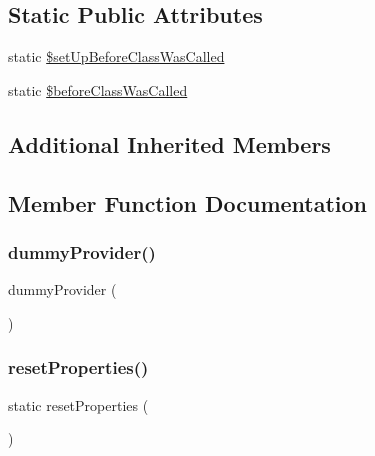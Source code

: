 \subsection*{Static Public Attributes}
\begin{DoxyCompactItemize}
\item 
static \mbox{\hyperlink{class_before_class_with_only_data_provider_test_a4f19a38698772667be46a51959914faf}{\$set\+Up\+Before\+Class\+Was\+Called}}
\item 
static \mbox{\hyperlink{class_before_class_with_only_data_provider_test_aa9363b7183745be2c2026c502bf7228b}{\$before\+Class\+Was\+Called}}
\end{DoxyCompactItemize}
\subsection*{Additional Inherited Members}


\subsection{Member Function Documentation}
\mbox{\label{class_before_class_with_only_data_provider_test_a785e395ec7ddda79b78e483307610593}} 
\subsubsection{\texorpdfstring{dummy\+Provider()}{dummyProvider()}}
{\footnotesize\ttfamily dummy\+Provider (\begin{DoxyParamCaption}{ }\end{DoxyParamCaption})}

\mbox{\label{class_before_class_with_only_data_provider_test_a005afccec5fc30c336e4d5d9287760a6}} 
\subsubsection{\texorpdfstring{reset\+Properties()}{resetProperties()}}
{\footnotesize\ttfamily static reset\+Properties (\begin{DoxyParamCaption}{ }\end{DoxyParamCaption})\hspace{0.3cm}{\ttfamily [static]}}

